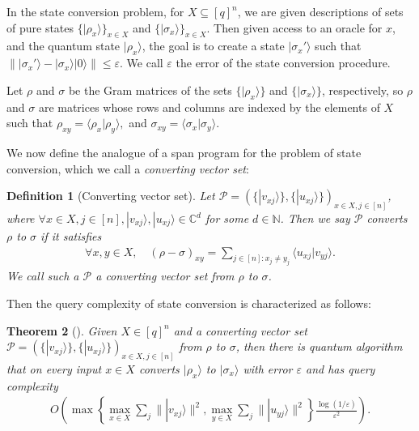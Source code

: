\documentclass[cleveref, autoref, thm-restate,11pt]{article}
\newtheorem{theorem}{Theorem}
\newtheorem{definition}[theorem]{Definition}
\theoremstyle{definition}
\newcommand{\ket}[1]{|#1\rangle}
\newcommand{\braket}[2]{\langle{#1}|{#2}\rangle}
\begin{document}
In the state conversion problem, for $X\subseteq [q]^n$, we are given
descriptions of sets of pure states $\{\ket{\rho_x}\}_{x\in X}$ and 
$\{\ket{\sigma_x}\}_{x\in X}$. Then given access to an oracle for
$x$, and the quantum state $\ket{\rho_x}$, the goal is to create a state
$\ket{\sigma_x'}$ such that 
$\|\ket{\sigma_x'}-\ket{\sigma_x}\ket{0}\|\leq \varepsilon$. We call $\varepsilon$ the error of the state
conversion procedure.

Let $\rho$ and $\sigma$ be the Gram matrices of the sets 
$\{\ket{\rho_x}\}$ and $\{\ket{\sigma_x}\}$, respectively, so $\rho$
and $\sigma$ are matrices whose rows and columns are indexed by the elements
of $X$ such that $\rho_{xy}=\braket{\rho_x}{\rho_y},$ and 
$\sigma_{xy}=\braket{\sigma_x}{\sigma_y}.$ 

We now define the analogue of a span program for the problem of state conversion, which
 we call a \textit{converting vector set}:
\begin{definition} [Converting vector set]
Let $\mathscr{P}=\left(\{\ket{v_{xj}}\},\{\ket{u_{xj}}\}\right)_{x\in X, j\in[n]}$, where $\forall x\in X, j\in [n],\ket{v_{xj}},\ket{u_{xj}}\in\mathbb{C}^d$ for some $d\in \mathbb{N}$. Then we say $\mathscr P$
converts $\rho$ to $\sigma$
if it satisfies
\begin{align}
\forall x,y\in X,\quad (\rho-\sigma)_{xy}=\sum_{j\in[n]:x_j\neq y_j}\braket{u_{xj}}{v_{yj}}.\label{eq:filteredNorm}
\end{align}
We call such a $\mathscr P$ a \em{converting vector set} from $\rho$ to $\sigma$.
\label{def:converting_vector_set}
\end{definition}

Then the query complexity of state conversion is characterized as follows:

\begin{theorem} [\cite{leeQuantumQueryComplexity2011}]
Given $X\in[q]^n$ and a converting vector set $\mathscr{P}=\left(\{\ket{v_{xj}}\},\{\ket{u_{xj}}\}\right)_{x\in X, j\in[n]}$ from $\rho$ to $\sigma$, then there is quantum algorithm that on every input $x\in X$ converts 
$\ket{\rho_x}$ to $\ket{\sigma_x}$ with error $\varepsilon$ and has query complexity
\begin{align}
O\left(\max\left\{\max_{x\in X}\sum_j\|\ket{v_{xj}}\|^2,\max_{y\in X}\sum_j\|\ket{u_{yj}}\|^2\right\}\frac{\log(1/\varepsilon)}{\varepsilon^2}\right).\label{eq:filteredNormMa}
\end{align}
\label{thm:StateConv}
\end{theorem}
\end{document}
